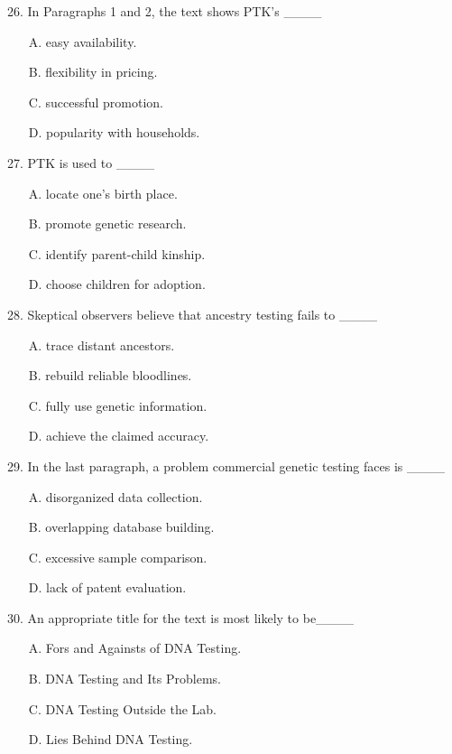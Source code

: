 \documentclass[UTF8,11pt]{ctexart}
\begin{document}
26. In Paragraphs 1 and 2, the text shows PTK’s \_\_\_\_


\begin{itemize}[leftmargin=2em,itemsep=.2em,topsep=.4em]\item[A.] easy availability.
\item[B.] flexibility in pricing.
\item[C.] successful promotion.
\item[D.] popularity with households.
\end{itemize}

27. PTK is used to \_\_\_\_


\begin{itemize}[leftmargin=2em,itemsep=.2em,topsep=.4em]\item[A.] locate one’s birth place.
\item[B.] promote genetic research.
\item[C.] identify parent-child kinship.
\item[D.] choose children for adoption.
\end{itemize}

28. Skeptical observers believe that ancestry testing fails to \_\_\_\_


\begin{itemize}[leftmargin=2em,itemsep=.2em,topsep=.4em]\item[A.] trace distant ancestors.
\item[B.] rebuild reliable bloodlines.
\item[C.] fully use genetic information.
\item[D.] achieve the claimed accuracy.
\end{itemize}

29. In the last paragraph, a problem commercial genetic testing faces is \_\_\_\_


\begin{itemize}[leftmargin=2em,itemsep=.2em,topsep=.4em]\item[A.] disorganized data collection.
\item[B.] overlapping database building.
\item[C.] excessive sample comparison.
\item[D.] lack of patent evaluation.
\end{itemize}

30. An appropriate title for the text is most likely to be\_\_\_\_


\begin{itemize}[leftmargin=2em,itemsep=.2em,topsep=.4em]\item[A.] Fors and Againsts of DNA Testing.
\item[B.] DNA Testing and Its Problems.
\item[C.] DNA Testing Outside the Lab.
\item[D.] Lies Behind DNA Testing.
\end{itemize}
\end{document}
